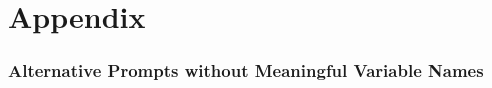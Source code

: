 \documentclass[dvipsnames]{article} \usepackage[accepted]{icml2022}
\begin{document}
 \let\oldaddcontentsline\addcontentsline
\renewcommand{\addcontentsline}[3]{}

\let\addcontentsline\oldaddcontentsline

\newpage
\appendix
\onecolumn

\doparttoc
\faketableofcontents

\part{Appendix}
\parttoc

\clearpage

\section{Alternative Prompts without Meaningful Variable Names}
\label{sec:gsm:additional_analysis}
\end{document}
